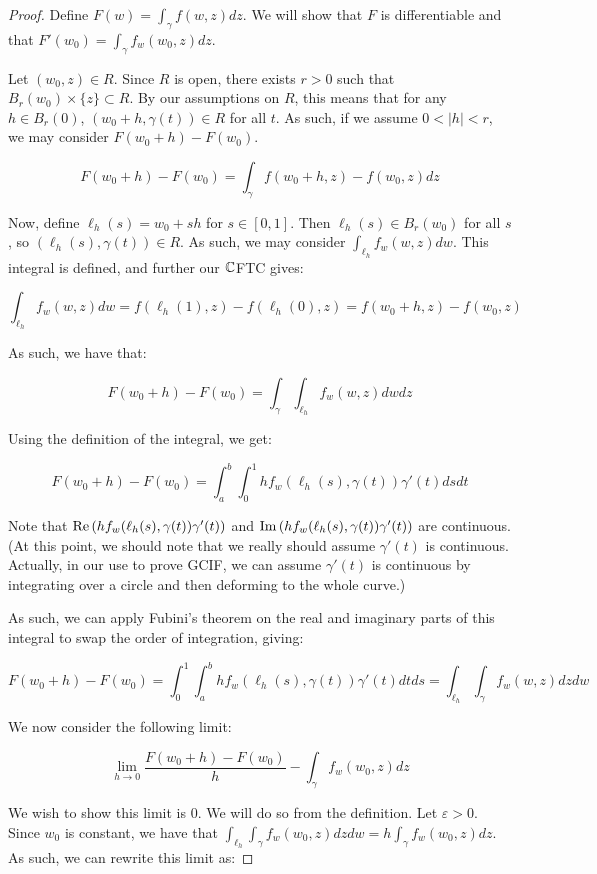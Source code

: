 \begin{proof}
Define $F(w) = \int_\gamma f(w,z)dz$. We will show that $F$ is differentiable and that $F'(w_0) = \int_\gamma f_w(w_0,z)dz$.

Let $(w_0,z)\in R$. Since $R$ is open, there exists $r>0$ such that $B_r(w_0)\times\{z\}\subset R$. By our assumptions on $R$, this means that for any $h\in B_r(0)$, $(w_0+h,\gamma(t))\in R$ for all $t$. As such, if we assume $0<|h|<r$, we may consider $F(w_0+h) - F(w_0)$.

$$F(w_0+h) - F(w_0) = \int_\gamma f(w_0+h,z) - f(w_0,z)dz$$

Now, define $\ell_h(s) = w_0 + sh$ for $s\in [0,1]$. Then $\ell_h(s) \in B_r(w_0)$ for all $s$, so $(\ell_h(s),\gamma(t))\in R$. As such, we may consider $\int_{\ell_h} f_w(w,z)dw$. This integral is defined, and further our $\mathbb{C}$FTC gives:

$$\int_{\ell_h} f_w(w,z)dw = f(\ell_h(1),z) - f(\ell_h(0),z) = f(w_0+h,z) - f(w_0,z)$$

As such, we have that:

$$F(w_0+h) - F(w_0) = \int_\gamma\int_{\ell_h} f_w(w,z)dwdz$$

Using the definition of the integral, we get:

$$F(w_0+h) - F(w_0) = \int_a^b\int_0^1 hf_w(\ell_h(s),\gamma(t))\gamma'(t)dsdt$$

Note that $\operatorname{Re}\left(hf_w(\ell_h(s),\gamma(t))\gamma'(t)\right)$ and $\operatorname{Im}\left(hf_w(\ell_h(s),\gamma(t))\gamma'(t)\right)$ are continuous. (At this point, we should note that we really should assume $\gamma'(t)$ is continuous. Actually, in our use to prove GCIF, we can assume $\gamma'(t)$ is continuous by integrating over a circle and then deforming to the whole curve.)

As such, we can apply Fubini's theorem on the real and imaginary parts of this integral to swap the order of integration, giving:

$$F(w_0+h) - F(w_0) = \int_0^1\int_a^b hf_w(\ell_h(s),\gamma(t))\gamma'(t)dtds = \int_{\ell_h}\int_\gamma f_w(w,z)dzdw$$

We now consider the following limit:

$$\lim_{h\rightarrow 0} \frac{F(w_0+h) - F(w_0)}{h} - \int_{\gamma} f_w(w_0,z)dz$$

We wish to show this limit is $0$. We will do so from the definition. Let $\varepsilon > 0$. Since $w_0$ is constant, we have that $\int_{\ell_h}\int_{\gamma} f_w(w_0,z)dzdw = h\int_{\gamma} f_w(w_0,z)dz$. As such, we can rewrite this limit as:


\end{proof}
